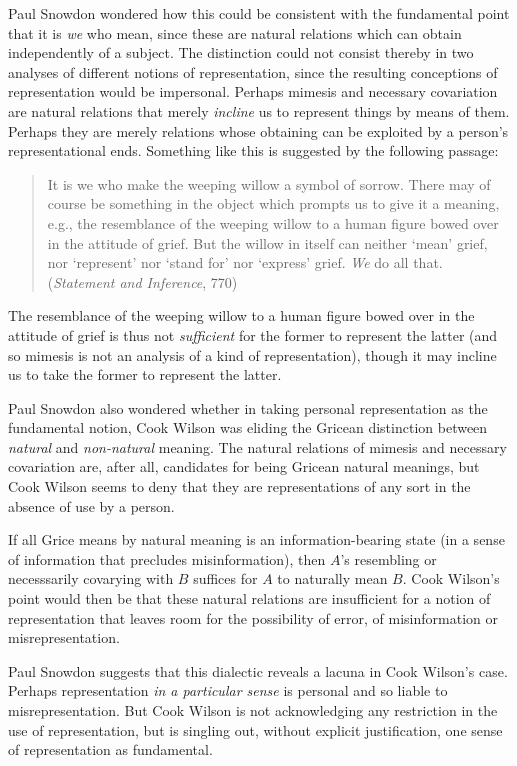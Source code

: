 \documentclass[11pt]{article}
\begin{document}
\begin{discussion}
    Paul Snowdon wondered how this could be consistent with the fundamental point that it is \emph{we} who mean, since these are natural relations which can obtain independently of a subject. The distinction could not consist thereby in two analyses of different notions of representation, since the resulting conceptions of representation would be impersonal. Perhaps mimesis and necessary covariation are natural relations that merely \emph{incline} us to represent things by means of them. Perhaps they are merely relations whose obtaining can be exploited by a person's representational ends. Something like this is suggested by the following passage:
    \begin{quote}
    	It is we who make the weeping willow a symbol of sorrow. There may of course be something in the object which prompts us to give it a meaning, e.g., the resemblance of the weeping willow to a human figure bowed over in the attitude of grief. But the willow in itself can neither `mean' grief, nor `represent' nor `stand for' nor `express' grief. \emph{We} do all that. (\emph{Statement and Inference}, 770)
    \end{quote}
    The resemblance of the weeping willow to a human figure bowed over in the attitude of grief is thus not \emph{sufficient} for the former to represent the latter (and so mimesis is not an analysis of a kind of representation), though it may incline us to take the former to represent the latter.

    Paul Snowdon also wondered whether in taking personal representation as the fundamental notion, Cook Wilson was eliding the Gricean distinction between \emph{natural} and \emph{non-natural} meaning. The natural relations of mimesis and necessary covariation are, after all, candidates for being Gricean natural meanings, but Cook Wilson seems to deny that they are representations of any sort in the absence of use by a person.

    If all Grice means by natural meaning is an information-bearing state (in a sense of information that precludes misinformation), then \( A \)'s resembling or necesssarily covarying with \( B \) suffices for \( A \) to naturally mean \( B \). Cook Wilson's point would then be that these natural relations are insufficient for a notion of representation that leaves room for the possibility of error, of misinformation or misrepresentation.

    Paul Snowdon suggests that this dialectic reveals a lacuna in Cook Wilson's case. Perhaps representation \emph{in a particular sense} is personal and so liable to misrepresentation. But Cook Wilson is not acknowledging any restriction in the use of representation, but is singling out, without explicit justification, one sense of representation as fundamental.
\end{discussion}
\end{document}
